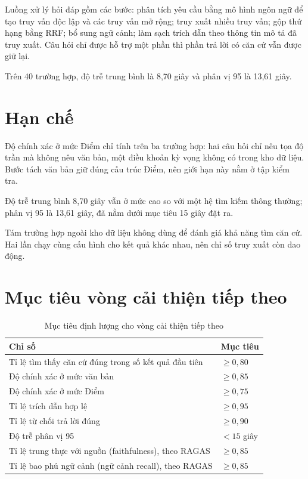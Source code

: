 \documentclass[12pt,a4paper,oneside]{report}
\begin{document}
Luồng xử lý hỏi đáp gồm các bước: phân tích yêu cầu bằng mô hình ngôn ngữ để tạo truy vấn độc lập và các truy vấn mở rộng; truy xuất nhiều truy vấn; gộp thứ hạng bằng RRF; bổ sung ngữ cảnh; làm sạch trích dẫn theo thông tin mô tả đã truy xuất. Câu hỏi chỉ được hỗ trợ một phần thì phần trả lời có căn cứ vẫn được giữ lại.

Trên 40 trường hợp, độ trễ trung bình là 8,70 giây và phân vị 95 là 13,61 giây.

\section*{Hạn chế}
{}
Độ chính xác ở mức Điểm chỉ tính trên ba trường hợp: hai câu hỏi chỉ nêu tọa độ trần mà không nêu văn bản, một điều khoản kỳ vọng không có trong kho dữ liệu. Bước tách văn bản giữ đúng cấu trúc Điểm, nên giới hạn này nằm ở tập kiểm tra.

Độ trễ trung bình 8,70 giây vẫn ở mức cao so với một hệ tìm kiếm thông thường; phân vị 95 là 13,61 giây, đã nằm dưới mục tiêu 15 giây đặt ra.

Tám trường hợp ngoài kho dữ liệu không dùng để đánh giá khả năng tìm căn cứ. Hai lần chạy cùng cấu hình cho kết quả khác nhau, nên chỉ số truy xuất còn dao động.

\section*{Mục tiêu vòng cải thiện tiếp theo}
{}
\begin{table}[H]
  \centering
  \caption{Mục tiêu định lượng cho vòng cải thiện tiếp theo}
  \begin{tabularx}{\textwidth}{|L{8.0cm}|Z|}
    \hline
    \textbf{Chỉ số}                                       & \textbf{Mục tiêu} \\
    \hline
    Tỉ lệ tìm thấy căn cứ đúng trong số kết quả đầu tiên  & $\geq 0,80$       \\
    \hline
    Độ chính xác ở mức văn bản                            & $\geq 0,85$       \\
    \hline
    Độ chính xác ở mức Điểm                               & $\geq 0,75$       \\
    \hline
    Tỉ lệ trích dẫn hợp lệ                                & $\geq 0,95$       \\
    \hline
    Tỉ lệ từ chối trả lời đúng                            & $\geq 0,90$       \\
    \hline
    Độ trễ phân vị 95                                     & $<15$ giây        \\
    \hline
    Tỉ lệ trung thực với nguồn (faithfulness), theo RAGAS & $\geq 0,85$       \\
    \hline
    Tỉ lệ bao phủ ngữ cảnh (ngữ cảnh recall), theo RAGAS  & $\geq 0,85$       \\
    \hline
  \end{tabularx}
\end{table}
\end{document}
